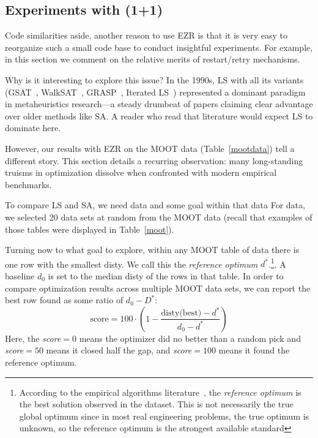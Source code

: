\documentclass[AMA,STIX2COL]{WileyNJDv5}
\begin{document}
{ 
\subsection{Experiments with (1+1)}\label{sec:opt-results}

 

Code similarities aside, another reason to use EZR is that it is
very easy to reorganize such a small code base to conduct insightful
experiments. For example, in this section we comment
on the relative merits of restart/retry mechanisms.


Why is it interesting to explore this issue?
In the 1990s, LS with all its variants (GSAT~\cite{gsat},
WalkSAT~\cite{walksat}, GRASP~\cite{grasp}, Iterated LS~\cite{ils})
represented a dominant paradigm in metaheuristics research—a 
steady drumbeat of papers claiming clear advantage over older 
methods like SA. A reader who
read that literature would expect LS to dominate here.

However, our results with EZR on the MOOT data
(Table~\ref{mootdata}) tell a different story. This section
details a recurring observation: many long-standing truisms
in optimization dissolve when confronted with modern
empirical benchmarks.




To compare LS and SA,  we need data and some goal
within that data
For data, we selected 20 data sets at random from the MOOT data
 (recall
that examples of those tables were displayed in 
Table~\ref{moot}). 


Turning now to what goal to explore, within any MOOT table
of data there is one row with
the smallest \textsf{disty}. We call this the {\em reference
optimum} $d^*$.\footnote{According to the
empirical algorithms literature~\cite{McGeoch2012,cohen1995empirical},
the 
{\em reference optimum} is the best solution observed in the dataset. This is not necessarily the true global optimum
since in most real engineering problems,
the true optimum is unknown, so the reference optimum is the
strongest available standard}.   A   baseline $d_0$ is set to
the median \textsf{disty} of the rows in that table.
In order to compare optimization results across multiple
MOOT data sets, we can report the best row found as some
ratio of $d_0 - D^*$: 
\begin{equation}\label{eq:wins}
  \text{score} = 100 \cdot \left( 1 - \frac{\text{disty(best)} - d^*}{d_0 - d^*} \right)
\end{equation}
Here, the {\em score}$=0$  means the optimizer did no better than a random pick and {\em score}$=50$
means it closed half the gap, and 
{\em score}$=100$ means it found the reference
optimum.

}
\end{document}
